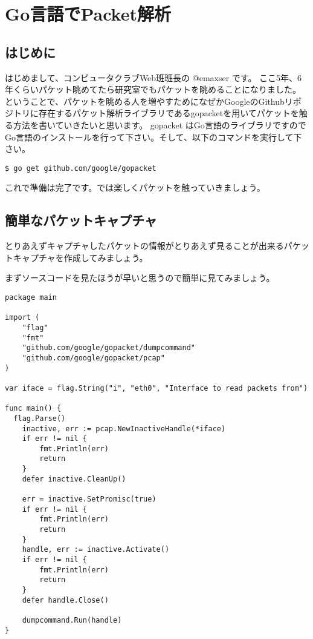 

\chapter{Go言語でPacket解析}
\section{はじめに}
はじめまして、コンピュータクラブWeb班班長の @emaxser です。
ここ5年、6年くらいパケット眺めてたら研究室でもパケットを眺めることになりました。
ということで、パケットを眺める人を増やすためになぜかGoogleのGithubリポジトリに存在するパケット解析ライブラリであるgopacketを用いてパケットを触る方法を書いていきたいと思います。
gopacket はGo言語のライブラリですのでGo言語のインストールを行って下さい。そして、以下のコマンドを実行して下さい。

\begin{lstlisting}
$ go get github.com/google/gopacket
\end{lstlisting}

これで準備は完了です。では楽しくパケットを触っていきましょう。

\section{簡単なパケットキャプチャ}
とりあえずキャプチャしたパケットの情報がとりあえず見ることが出来るパケットキャプチャを作成してみましょう。

まずソースコードを見たほうが早いと思うので簡単に見てみましょう。

\begin{lstlisting}
package main

import (
	"flag"
	"fmt"
	"github.com/google/gopacket/dumpcommand"
	"github.com/google/gopacket/pcap"
)

var iface = flag.String("i", "eth0", "Interface to read packets from")

func main() {
  flag.Parse()
	inactive, err := pcap.NewInactiveHandle(*iface)
	if err != nil {
		fmt.Println(err)
		return
	}
	defer inactive.CleanUp()

	err = inactive.SetPromisc(true)
	if err != nil {
		fmt.Println(err)
		return
	}
	handle, err := inactive.Activate()
	if err != nil {
		fmt.Println(err)
		return
	}
	defer handle.Close()

	dumpcommand.Run(handle)
}
\end{lstlisting}

